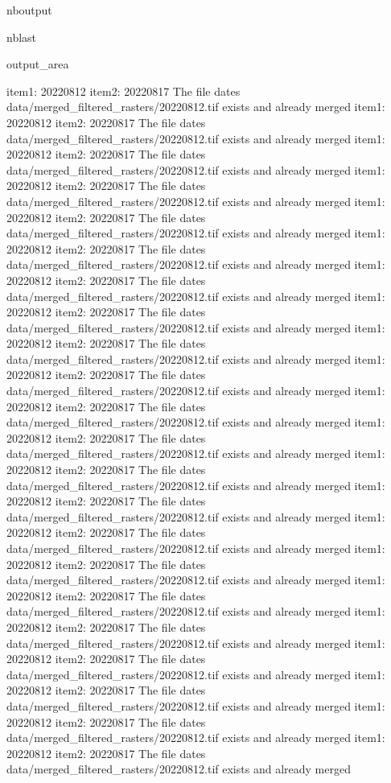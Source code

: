 \documentclass[letterpaper,10pt]{sphinxmanual}
\begin{document}
\begin{sphinxuseclass}{nboutput}
\begin{sphinxuseclass}{nblast}
{\begin{sphinxuseclass}{output_area}
\begin{sphinxuseclass}{}
\begin{sphinxVerbatim}[commandchars=\\\{\}]
item1:  20220812
item2:  20220817
The file dates data/merged\_filtered\_rasters/20220812.tif exists and already merged
item1:  20220812
item2:  20220817
The file dates data/merged\_filtered\_rasters/20220812.tif exists and already merged
item1:  20220812
item2:  20220817
The file dates data/merged\_filtered\_rasters/20220812.tif exists and already merged
item1:  20220812
item2:  20220817
The file dates data/merged\_filtered\_rasters/20220812.tif exists and already merged
item1:  20220812
item2:  20220817
The file dates data/merged\_filtered\_rasters/20220812.tif exists and already merged
item1:  20220812
item2:  20220817
The file dates data/merged\_filtered\_rasters/20220812.tif exists and already merged
item1:  20220812
item2:  20220817
The file dates data/merged\_filtered\_rasters/20220812.tif exists and already merged
item1:  20220812
item2:  20220817
The file dates data/merged\_filtered\_rasters/20220812.tif exists and already merged
item1:  20220812
item2:  20220817
The file dates data/merged\_filtered\_rasters/20220812.tif exists and already merged
item1:  20220812
item2:  20220817
The file dates data/merged\_filtered\_rasters/20220812.tif exists and already merged
item1:  20220812
item2:  20220817
The file dates data/merged\_filtered\_rasters/20220812.tif exists and already merged
item1:  20220812
item2:  20220817
The file dates data/merged\_filtered\_rasters/20220812.tif exists and already merged
item1:  20220812
item2:  20220817
The file dates data/merged\_filtered\_rasters/20220812.tif exists and already merged
item1:  20220812
item2:  20220817
The file dates data/merged\_filtered\_rasters/20220812.tif exists and already merged
item1:  20220812
item2:  20220817
The file dates data/merged\_filtered\_rasters/20220812.tif exists and already merged
item1:  20220812
item2:  20220817
The file dates data/merged\_filtered\_rasters/20220812.tif exists and already merged
item1:  20220812
item2:  20220817
The file dates data/merged\_filtered\_rasters/20220812.tif exists and already merged
item1:  20220812
item2:  20220817
The file dates data/merged\_filtered\_rasters/20220812.tif exists and already merged
item1:  20220812
item2:  20220817
The file dates data/merged\_filtered\_rasters/20220812.tif exists and already merged
item1:  20220812
item2:  20220817
The file dates data/merged\_filtered\_rasters/20220812.tif exists and already merged
item1:  20220812
item2:  20220817
The file dates data/merged\_filtered\_rasters/20220812.tif exists and already merged
item1:  20220812
item2:  20220817
The file dates data/merged\_filtered\_rasters/20220812.tif exists and already merged

\end{sphinxVerbatim}
\end{sphinxuseclass}
\end{sphinxuseclass}}
\end{sphinxuseclass}
\end{sphinxuseclass}
\end{document}
